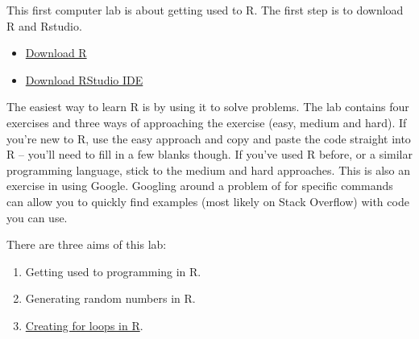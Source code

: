 \documentclass[
]{book}
\providecommand{\tightlist}{%
  \setlength{\itemsep}{0pt}\setlength{\parskip}{0pt}}
\theoremstyle{definition}
\theoremstyle{definition}
\theoremstyle{definition}
\theoremstyle{definition}
\theoremstyle{remark}
\begin{document}
This first computer lab is about getting used to R. The first step is to download R and Rstudio.

\begin{itemize}
\tightlist
\item
  \href{https://www.r-project.org}{Download R}
\item
  \href{https://posit.co/downloads/}{Download RStudio IDE}
\end{itemize}

The easiest way to learn R is by using it to solve problems. The lab contains four exercises and three ways of approaching the exercise (easy, medium and hard). If you're new to R, use the easy approach and copy and paste the code straight into R -- you'll need to fill in a few blanks though. If you've used R before, or a similar programming language, stick to the medium and hard approaches. This is also an exercise in using Google. Googling around a problem of for specific commands can allow you to quickly find examples (most likely on Stack Overflow) with code you can use.

There are three aims of this lab:

\begin{enumerate}
\def\labelenumi{\arabic{enumi}.}
\tightlist
\item
  Getting used to programming in R.
\item
  Generating random numbers in R.
\item
  \href{https://www.w3schools.com/r/r_for_loop.asp}{Creating for loops in R}.
\end{enumerate}
\end{document}
